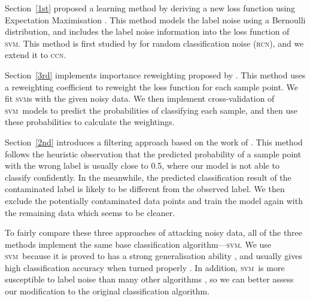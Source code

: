 \documentclass[12pt]{article} %
\newcommand{\svm}{\textsc{svm}}
\begin{document}

Section~\ref{1st} proposed a learning method by deriving a new loss function using Expectation Maximisation \citep[p.423]{Bishop:2006:PRM:1162264}. This method models the label noise using a Bernoulli distribution, and includes the label noise information into the loss function of \svm. This method is first studied by \citet{pmlr-v20-biggio11} for random classification noise (\textsc{rcn}), and we extend it to \textsc{ccn}.

Section~\ref{3rd} implements importance reweighting proposed by \citet{liu2016classification}. This method uses a reweighting coefficient to reweight the loss function for each sample point. We fit \svm s with the given noisy data. We then implement cross-validation of \svm\ models to predict the probabilities of classifying each sample, and then use these probabilities to calculate the weightings.

Section~\ref{2nd} introduces a filtering approach based on the work of \citet{brodley1996identifying}. This method follows the heuristic observation that the predicted probability of a sample point with the wrong label is usually close to 0.5, where our model is not able to classify confidently. In the meanwhile, the predicted classification result of the contaminated label is likely to be different from the observed label.  We then exclude the potentially contaminated data points and train the model again with the remaining data which seems to be cleaner.

To fairly compare these three approaches of attacking noisy data, all of the three methods implement the same base classification algorithm---\svm. We use \svm\ because it is proved to has a strong generalisation ability \citep{NIPS2012_4500,Seeger:2003:PGE:944919.944929,Cortes1995}, and usually gives high classification accuracy when turned properly \citep{Fernandez-Delgado:2014:WNH:2627435.2697065}. In addition, \svm\ is more susceptible to label noise than many other algorithms \citep{frenay2014classification}, so we can better assess our modification to the original classification algorithm.
\end{document}
